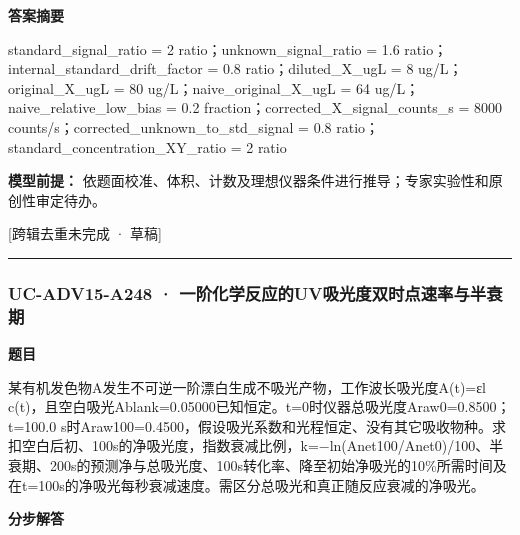 \documentclass[UTF8,11pt,a4paper]{ctexart}
\begin{document}
\noindent\textbf{答案摘要}\par
standard\_signal\_ratio = 2 ratio；unknown\_signal\_ratio = 1.6 ratio；internal\_standard\_drift\_factor = 0.8 ratio；diluted\_X\_ugL = 8 ug/L；original\_X\_ugL = 80 ug/L；naive\_original\_X\_ugL = 64 ug/L；naive\_relative\_low\_bias = 0.2 fraction；corrected\_X\_signal\_counts\_s = 8000 counts/s；corrected\_unknown\_to\_std\_signal = 0.8 ratio；standard\_concentration\_XY\_ratio = 2 ratio\par
\noindent\textbf{模型前提：}
依题面校准、体积、计数及理想仪器条件进行推导；专家实验性和原创性审定待办。\par
\noindent\textcolor{red!65!black}{[跨辑去重未完成 · 草稿]} \par
\medskip\hrule\medskip
{}
\subsubsection*{UC-ADV15-A248 · 一阶化学反应的UV吸光度双时点速率与半衰期}
\noindent\textbf{题目}\par
某有机发色物A发生不可逆一阶漂白生成不吸光产物，工作波长吸光度A(t)=εl c(t)，且空白吸光Ablank=0.05000已知恒定。t=0时仪器总吸光度Araw0=0.8500；t=100.0 s时Araw100=0.4500，假设吸光系数和光程恒定、没有其它吸收物种。求扣空白后初、100s的净吸光度，指数衰减比例，k=−ln(Anet100/Anet0)/100、半衰期、200s的预测净与总吸光度、100s转化率、降至初始净吸光的10\%所需时间及在t=100s的净吸光每秒衰减速度。需区分总吸光和真正随反应衰减的净吸光。\par
\medskip\noindent\textbf{分步解答}
\end{document}
